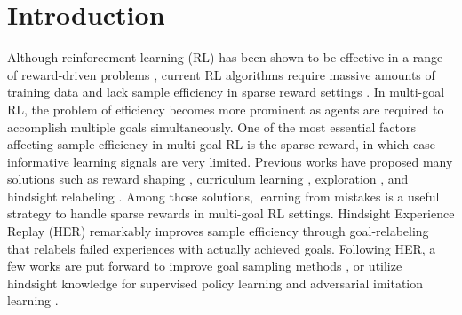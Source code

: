 \documentclass{article}
\begin{document}
\section{Introduction}
Although reinforcement learning (RL) has been shown to be effective in a range of reward-driven problems \cite{mnih2015human,lillicrap2015continuous,haarnoja2018soft,DBLP:journals/corr/abs-2106-03050}, current RL algorithms require massive amounts of training data \cite{wang2016learning} and lack sample efficiency in sparse reward settings \cite{andrychowicz2017hindsight}.
In multi-goal RL, the problem of efficiency becomes more prominent as agents are required to accomplish multiple goals simultaneously. One of the most essential factors affecting sample efficiency in multi-goal RL is the sparse reward, in which case informative learning signals are very limited. Previous works have proposed many solutions such as reward shaping \cite{ng1999policy}, curriculum learning \cite{bengio2009curriculum}, exploration \cite{pathak2017curiosity,zhao2019maximum}, and hindsight relabeling \cite{DBLP:conf/ijcai/Kaelbling93,andrychowicz2017hindsight}. Among those solutions, learning from mistakes is a useful strategy to handle sparse rewards in multi-goal RL settings. Hindsight Experience Replay (HER) \cite{andrychowicz2017hindsight} remarkably improves sample efficiency through goal-relabeling that relabels failed experiences with actually achieved goals. Following HER, a few works are put forward to improve goal sampling methods \cite{fang2019curriculum,pitis2020maximum,DBLP:conf/nips/LiPA20,DBLP:conf/nips/EysenbachGLS20}, or utilize hindsight knowledge for supervised policy learning \cite{DBLP:conf/nips/SunLLZL19,ghosh2021learning} and adversarial imitation learning \cite{ding2019goal}.
\end{document}
